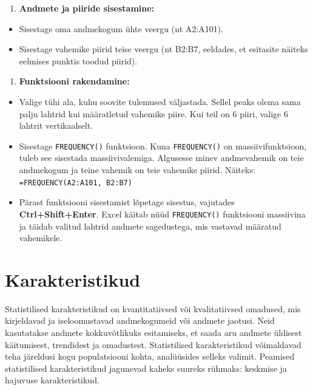 \documentclass[
]{book}
\providecommand{\tightlist}{%
  \setlength{\itemsep}{0pt}\setlength{\parskip}{0pt}}
\begin{document}
\begin{enumerate}
\def\labelenumi{\arabic{enumi}.}
\tightlist
\item
  \textbf{Andmete ja piiride sisestamine:}
\end{enumerate}

\begin{itemize}
\tightlist
\item
  Sisestage oma andmekogum ühte veergu (nt A2:A101).
\item
  Sisestage vahemike piirid teise veergu (nt B2:B7, eeldades, et esitasite näiteks eelmises punktis toodud piirid).
\end{itemize}

\begin{enumerate}
\def\labelenumi{\arabic{enumi}.}
\setcounter{enumi}{1}
\tightlist
\item
  \textbf{Funktsiooni rakendamine:}
\end{enumerate}

\begin{itemize}
\tightlist
\item
  Valige tühi ala, kuhu soovite tulemused väljastada. Sellel peaks olema sama palju lahtrid kui määratletud vahemike piire. Kui teil on 6 piiri, valige 6 lahtrit vertikaalselt.
\item
  Sisestage \texttt{FREQUENCY()} funktsioon. Kuna \texttt{FREQUENCY()} on massiivifunktsioon, tuleb see sisestada massiivivalemiga. Algusesse minev andmevahemik on teie andmekogum ja teine vahemik on teie vahemike piirid.
  Näiteks: \texttt{=FREQUENCY(A2:A101,\ B2:B7)}
\item
  Pärast funktsiooni sisestamist lõpetage sisestus, vajutades \textbf{Ctrl+Shift+Enter}. Excel käitab nüüd \texttt{FREQUENCY()} funktsiooni massiivina ja täidab valitud lahtrid andmete sagedustega, mis vastavad määratud vahemikele.
\end{itemize}

\chapter{Karakteristikud}\label{karakteristikud}

Statistilised karakteristikud on kvantitatiivsed või kvalitatiivsed omadused, mis kirjeldavad ja iseloomustavad andmekogumeid või andmete jaotusi. Neid kasutatakse andmete kokkuvõtlikuks esitamiseks, et saada aru andmete üldisest käitumisest, trendidest ja omadustest. Statistilised karakteristikud võimaldavad teha järeldusi kogu populatsiooni kohta, analüüsides selleks valimit. Peamised statistilised karakteristikud jagunevad kaheks suureks rühmaks: keskmise ja hajuvuse karakteristikud.
\end{document}

